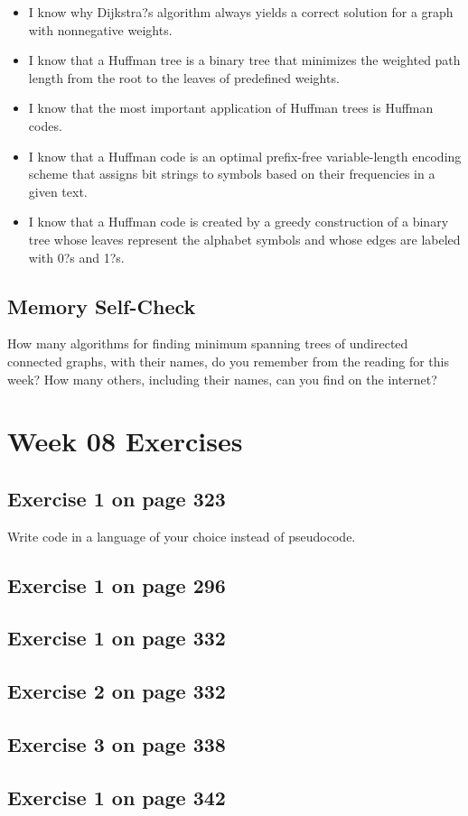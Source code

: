 \documentclass[12pt]{amsart}
\begin{document}
\begin{itemize}
 \item I know why Dijkstra?s algorithm always yields a correct solution for a graph with nonnegative weights.
 \item I know that a Huffman tree is a binary tree that minimizes the weighted path length from the root to the leaves of predefined weights.
 \item I know that the most important application of Huffman trees is Huffman codes.
 \item I know that a Huffman code is an optimal prefix-free variable-length encoding scheme that assigns bit strings to symbols based on their frequencies in a given text.
 \item I know that a Huffman code is created by a greedy construction of a binary tree whose leaves represent the alphabet symbols and whose edges are labeled with 0?s and 1?s.
\end{itemize}
\subsection{Memory Self-Check}
How many algorithms for finding minimum spanning trees of undirected connected graphs, with their names, do you remember from the reading for this week? How many others, including their names, can you find on the internet?
 \section{Week 08 Exercises}
\subsection{ Exercise 1 on page 323}
Write code in a language of your choice instead of pseudocode. 
\subsection{ Exercise 1 on page 296} 
\subsection{Exercise 1 on page 332} 
\subsection{Exercise 2 on page 332} 
\subsection{Exercise 3 on page 338} 
\subsection{Exercise 1 on page 342} 
\end{document}
